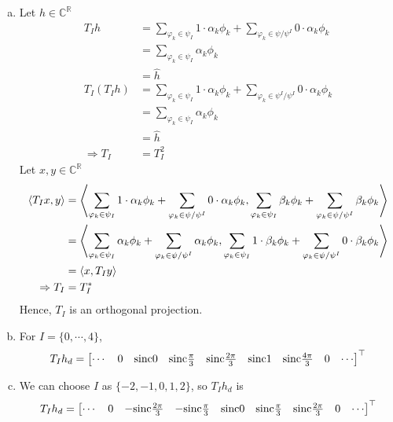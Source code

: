 \begin{enumerate}[(a)]
\item 
\begin{comment}
	$\forall z \in \mathbb{C}^\mathbb{Z}$, we have
	\[T_I z = \sum_{\varphi_k \in \psi} \beta_k\varphi_k \perp T_Ih_d - h_d = \sum_{\varphi_k \in \psi/\psi^I} \alpha_k\varphi_k\]
	\[\Rightarrow \innerprod{T_I z}{T_Ih_d - h_d} = 0, \forall z \in \mathbb{C}^\mathbb{Z}\]
	Hence, $T_I$ is an orthogonal projection.
\end{comment}
Let $h \in \mathbb{C}^\mathbb{R}$
\begin{align*}
	T_Ih 
	&= \sum_{\varphi_k \in \psi_I}1\cdot\alpha_k\phi_k + \sum_{\varphi_k \in \psi/\psi^I}0\cdot\alpha_k\phi_k \\
	&= \sum_{\varphi_k \in \psi_I}\alpha_k\phi_k \\
	&= \hat{h}\\
	T_I (T_I h)
	&= \sum_{\varphi_k \in \psi_I}1\cdot\alpha_k\phi_k + \sum_{\varphi_k \in \psi^I/\psi^I}0\cdot\alpha_k\phi_k \\
	&= \sum_{\varphi_k \in \psi_I}\alpha_k\phi_k \\
	&= \hat{h} \\
	\Rightarrow T_I &= T_I^2
\end{align*}
Let $x,y \in \mathbb{C}^\mathbb{R}$
\begin{align*}
	\left\langle T_Ix, y \right\rangle
	&= \left\langle \sum_{\varphi_k \in \psi_I}1\cdot\alpha_k\phi_k + \sum_{\varphi_k \in \psi/\psi^I}0\cdot\alpha_k\phi_k, \sum_{\varphi_k \in \psi_I}\beta_k\phi_k + \sum_{\varphi_k \in \psi/\psi^I}\beta_k\phi_k \right\rangle \\
	&= \left\langle \sum_{\varphi_k \in \psi_I}\alpha_k\phi_k + \sum_{\varphi_k \in \psi/\psi^I}\alpha_k\phi_k, \sum_{\varphi_k \in \psi_I}1\cdot\beta_k\phi_k + \sum_{\varphi_k \in \psi/\psi^I}0\cdot\beta_k\phi_k \right\rangle \\
	&= \left\langle x, T_Iy \right\rangle \\
	\Rightarrow T_I &= T_I^*
\end{align*}
Hence, $T_I$ is an orthogonal projection.

\item For $I = \{0, \cdots, 4\}$,
\[T_Ih_d = \begin{bmatrix} \cdots & 0 & \mathrm{sinc} 0 & \mathrm{sinc} \frac{\pi}{3} & \mathrm{sinc} \frac{2\pi}{3} & \mathrm{sinc} 1 & \mathrm{sinc} \frac{4\pi}{3} & 0 & \cdots  \end{bmatrix}^\top\]

\item We can choose $I$ as $\{-2,-1,0,1,2\}$, so $T_Ih_d$ is
\[T_Ih_d = \begin{bmatrix} \cdots & 0 & -\mathrm{sinc} \frac{2\pi}{3} & -\mathrm{sinc} \frac{\pi}{3} & \mathrm{sinc} 0 & \mathrm{sinc} \frac{\pi}{3} & \mathrm{sinc} \frac{2\pi}{3} & 0 & \cdots \end{bmatrix}^\top\]

\end{enumerate}